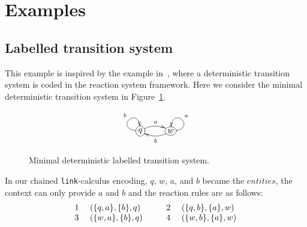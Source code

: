 \section{Examples}
\label{ex:examples}

\subsection{Labelled transition system}
This example is inspired by the example in~\cite{BEMR11}, where
a deterministic transition system is coded in the reaction system
framework.
Here we consider the minimal deterministic transition system in Figure~\ref{fig:lts}.
\begin{figure}
\[
\xymatrix{
*+[o][F-]{q} \ar@/ ^/[r]^a \ar@(l,u)[]^b &
*+[o][F-]{w} \ar@/^/[l]^b \ar@(r,u)[]_a
}
\]
\caption{Minimal deterministic labelled transition system.}
\label{fig:lts}
\end{figure}
\noindent
In our chained {\tt link}-calculus encoding, $q$, $w$, $a$, and $b$ became the $entities$, the context can only provide $a$ and $b$ and the reaction rules are as follows:\\
\[
\begin{array}{cl@{\hspace{1cm}} cl}
1 \ &(\{q,a\},\{b\},q) & 2\ &(\{q,b\},\{a\},w)\\
3 \  &(\{w,a\},\{b\},q) & 4\ &(\{w,b\},\{a\},w)\\ 
\end{array}
\]

